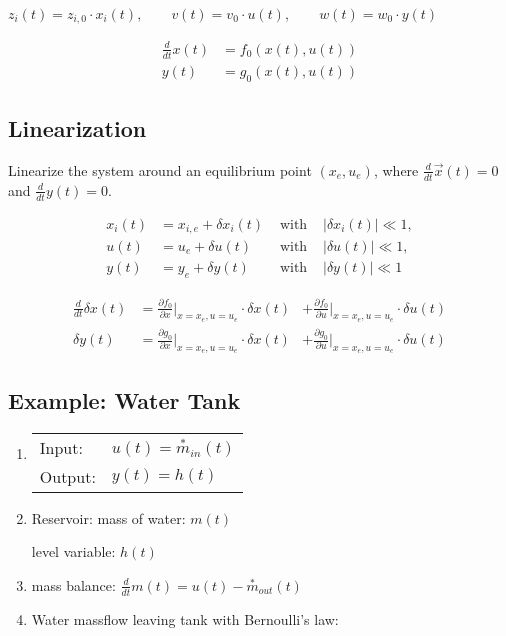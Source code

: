 \documentclass[10pt,a4paper]{scrartcl}
\begin{document}
\begin{multicols*}{3}
	$z_i(t)=z_{i,0}\cdot x_i(t),\qquad v(t)=v_0\cdot u(t),\qquad w(t)=w_0\cdot y(t)$
	
	\begin{align*}
	\frac{d}{dt}x(t)&=f_0(x(t),u(t))\\
	y(t)&=g_0(x(t),u(t))
	\end{align*}
	
\subsection{Linearization}
	
Linearize the system around an equilibrium point $(x_e,u_e)$, where $\frac{d}{dt}\vec{x}(t)=0$ and $\frac{d}{dt}y(t)=0$.
	
\begin{alignat*}{4}
x_i(t)&=x_{i,e}+\delta x_i(t)&\text{ with  }&|\delta x_i(t)|\ll 1,\\
u(t)&=u_e+\delta u(t)&\text{ with  }&|\delta u(t)|\ll 1,\\
y(t)&=y_e+\delta y(t)&\text{ with  } &|\delta y(t)|\ll 1
\end{alignat*}
	
\begin{alignat*}{3}
\frac{d}{dt}\delta x(t) &= \frac{\partial f_0}{\partial x}|_{x=x_e,u=u_e}\cdot \delta x(t)&+\frac{\partial f_0}{\partial u}|_{x=x_e,u=u_e}\cdot \delta u(t)\\
\delta y(t)&=\frac{\partial g_0}{\partial x}|_{x=x_e,u=u_e}\cdot\delta x(t) &+\frac{\partial g_0}{\partial u}|_{x=x_e,u=u_e}\cdot\delta u(t)
\end{alignat*}
	
	
\subsection{Example: Water Tank}


\begin{enumerate}
\item \begin{tabular}{ll}Input:&$u(t)=\overset{\ast}{m}_{in}(t)$\\Output:&$y(t)=h(t)$\end{tabular}
\item Reservoir: mass of water: $m(t)$

level variable: $h(t)$
\item mass balance: $\frac{d}{dt}m(t)=u(t)-\overset{\ast}{m}_{out}(t)$
\item Water massflow leaving tank with Bernoulli's law:


\end{enumerate}
\end{multicols*}
\end{document}
